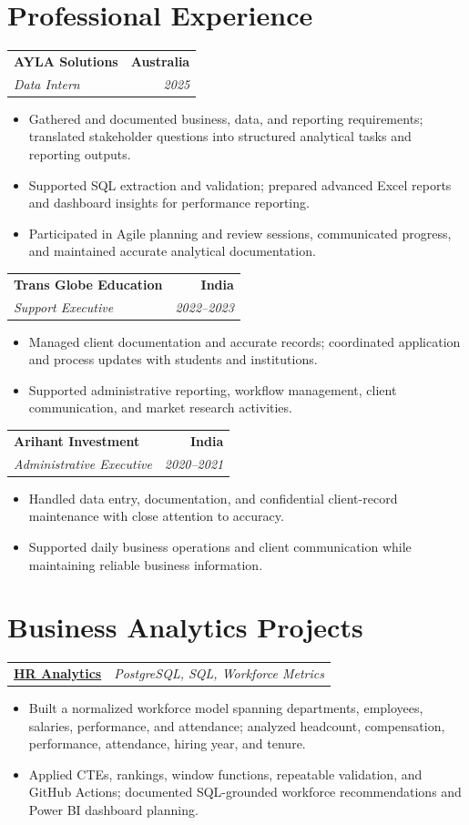 \documentclass[letterpaper,10pt]{article}
\makeatletter
\newcommand{\role}[4]{%
  \begin{tabularx}{\textwidth}{@{}Xr@{}}
    \textbf{#1} & \textbf{#2} \\
    \textit{#3} & \textit{#4}
  \end{tabularx}\vspace{-1pt}
}
\newcommand{\project}[2]{%
  \begin{tabularx}{\textwidth}{@{}Xr@{}}
    \textbf{#1} & \textit{#2}
  \end{tabularx}\vspace{-1pt}
}
\makeatother
\begin{document}
\section{Professional Experience}
\role{AYLA Solutions}{Australia}{Data Intern}{2025}
\begin{itemize}
  \item Gathered and documented business, data, and reporting requirements; translated stakeholder questions into structured analytical tasks and reporting outputs.
  \item Supported SQL extraction and validation; prepared advanced Excel reports and dashboard insights for performance reporting.
  \item Participated in Agile planning and review sessions, communicated progress, and maintained accurate analytical documentation.
\end{itemize}
\vspace{1pt}

\role{Trans Globe Education}{India}{Support Executive}{2022--2023}
\begin{itemize}
  \item Managed client documentation and accurate records; coordinated application and process updates with students and institutions.
  \item Supported administrative reporting, workflow management, client communication, and market research activities.
\end{itemize}
\vspace{1pt}

\role{Arihant Investment}{India}{Administrative Executive}{2020--2021}
\begin{itemize}
  \item Handled data entry, documentation, and confidential client-record maintenance with close attention to accuracy.
  \item Supported daily business operations and client communication while maintaining reliable business information.
\end{itemize}

\section{Business Analytics Projects}
\project{\href{https://github.com/jainalimehta/HR-Analytics}{HR Analytics}}{PostgreSQL, SQL, Workforce Metrics}
\begin{itemize}
  \item Built a normalized workforce model spanning departments, employees, salaries, performance, and attendance; analyzed headcount, compensation, performance, attendance, hiring year, and tenure.
  \item Applied CTEs, rankings, window functions, repeatable validation, and GitHub Actions; documented SQL-grounded workforce recommendations and Power BI dashboard planning.
\end{itemize}
\vspace{1pt}
\end{document}
